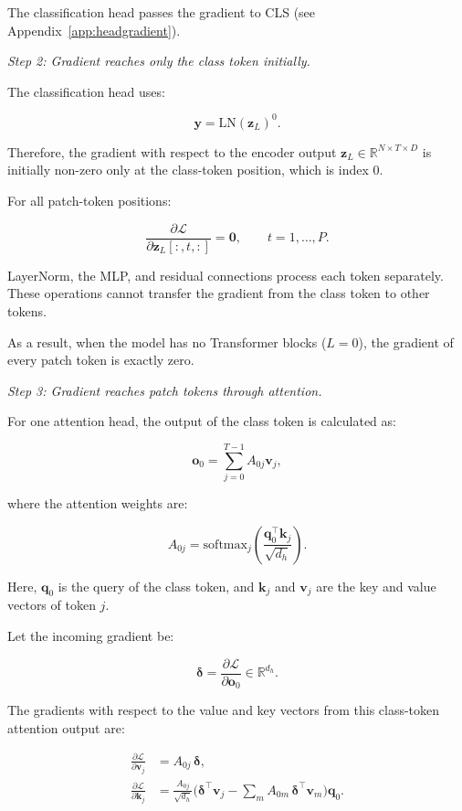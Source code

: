 \documentclass{article}
\begin{document}
The classification head passes the gradient to CLS (see Appendix~\ref{app:headgradient}).

\emph{Step 2: Gradient reaches only the class token initially.}

The classification head uses:

\[
\mathbf{y} = \mathrm{LN}(\mathbf{z}_L)^0.
\]

Therefore, the gradient with respect to the encoder output
$\mathbf{z}_L\in\mathbb{R}^{N\times T\times D}$ is initially
non-zero only at the class-token position, which is index 0.

For all patch-token positions:

\[
\frac{\partial\mathcal{L}}
{\partial\mathbf{z}_L[:,t,:]}
= \mathbf{0},
\qquad t=1,\dots,P.
\]

LayerNorm, the MLP, and residual connections process each
token separately. These operations cannot transfer the
gradient from the class token to other tokens.

As a result, when the model has no Transformer blocks
($L=0$), the gradient of every patch token is exactly zero.

\emph{Step 3: Gradient reaches patch tokens through attention.}

For one attention head, the output of the class token is
calculated as:

\[
\mathbf{o}_0 = \sum_{j=0}^{T-1}
A_{0j}\mathbf{v}_j,
\]

where the attention weights are:

\[
A_{0j} =
\mathrm{softmax}_j
\left(
\frac{\mathbf{q}_0^\top\mathbf{k}_j}{\sqrt{d_h}}
\right).
\]

Here, $\mathbf{q}_0$ is the query of the class token,
and $\mathbf{k}_j$ and $\mathbf{v}_j$ are the key and
value vectors of token $j$.

Let the incoming gradient be:

\[
\boldsymbol{\delta} =
\frac{\partial\mathcal{L}}{\partial\mathbf{o}_0}
\in\mathbb{R}^{d_h}.
\]

The gradients with respect to the value and key vectors
from this class-token attention output are:

\begin{align}
\frac{\partial\mathcal{L}}{\partial\mathbf{v}_j}
&= A_{0j}\,\boldsymbol{\delta},
\label{eq:dv}\\
\frac{\partial\mathcal{L}}{\partial\mathbf{k}_j}
&=
\frac{A_{0j}}{\sqrt{d_h}}
\Big(
\boldsymbol{\delta}^\top\mathbf{v}_j
-
\sum_m A_{0m}\,
\boldsymbol{\delta}^\top\mathbf{v}_m
\Big)\mathbf{q}_0.
\label{eq:dk}
\end{align}
\end{document}
